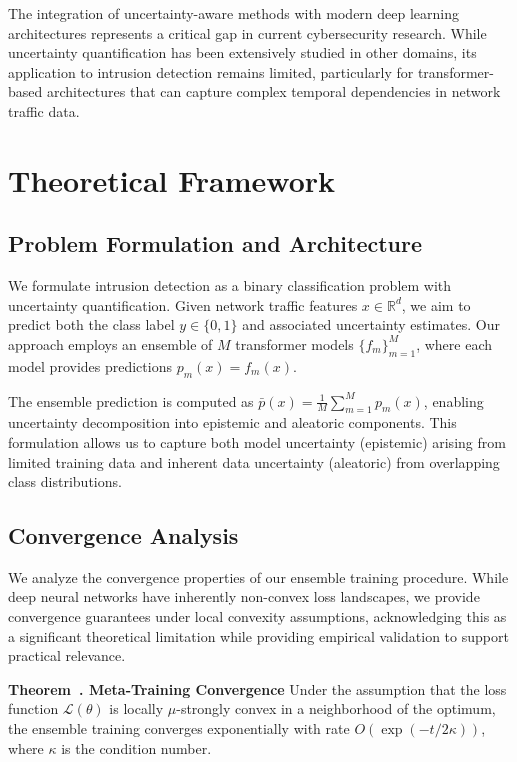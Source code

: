 \documentclass[journal]{IEEEtran}
\newcounter{theorem}
\newenvironment{theorem}[1][]{\refstepcounter{theorem}\par\medskip
   \noindent \textbf{Theorem~\thetheorem. #1} \rmfamily}{\medskip}
\begin{document}
The integration of uncertainty-aware methods with modern deep learning architectures represents a critical gap in current cybersecurity research. While uncertainty quantification has been extensively studied in other domains, its application to intrusion detection remains limited, particularly for transformer-based architectures that can capture complex temporal dependencies in network traffic data.

\section{Theoretical Framework}

\subsection{Problem Formulation and Architecture}

We formulate intrusion detection as a binary classification problem with uncertainty quantification. Given network traffic features $x \in \mathbb{R}^d$, we aim to predict both the class label $y \in \{0,1\}$ and associated uncertainty estimates. Our approach employs an ensemble of $M$ transformer models $\{f_m\}_{m=1}^M$, where each model provides predictions $p_m(x) = f_m(x)$.

The ensemble prediction is computed as $\bar{p}(x) = \frac{1}{M} \sum_{m=1}^M p_m(x)$, enabling uncertainty decomposition into epistemic and aleatoric components. This formulation allows us to capture both model uncertainty (epistemic) arising from limited training data and inherent data uncertainty (aleatoric) from overlapping class distributions.

\subsection{Convergence Analysis}

We analyze the convergence properties of our ensemble training procedure. While deep neural networks have inherently non-convex loss landscapes, we provide convergence guarantees under local convexity assumptions, acknowledging this as a significant theoretical limitation while providing empirical validation to support practical relevance.

\begin{theorem}[Meta-Training Convergence]
Under the assumption that the loss function $\mathcal{L}(\theta)$ is locally $\mu$-strongly convex in a neighborhood of the optimum, the ensemble training converges exponentially with rate $O(\exp(-t/2\kappa))$, where $\kappa$ is the condition number.
\end{theorem}
\end{document}
